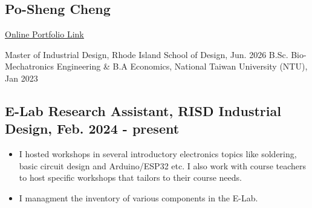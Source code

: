 \documentclass[12pt]{article}
\begin{document}
\begin{multicols}{2}
    \section*{Po-Sheng Cheng}
    \href{https://bencer3283.github.io/art/}{\underline{Online Portfolio Link}}
    
    \columnbreak
    {\sffamily \noindent
    Master of Industrial Design, Rhode Island School of Design, Jun. 2026 \newline
    B.Sc. Bio-Mechatronics Engineering \& \newline B.A Economics, National Taiwan University (NTU), Jan 2023
    }
\end{multicols}
        \subsection*{E-Lab Research Assistant, RISD Industrial Design, Feb. 2024 - present}
        {\sffamily
        \begin{itemize}
            \item I hosted workshops in several introductory electronics topics like soldering, basic circuit design and Arduino/ESP32 etc.
            I also work with course teachers to host specific workshops that tailors to their course needs.
            \item I managment the inventory of various components in the E-Lab.
        \end{itemize}
        }
\end{document}
